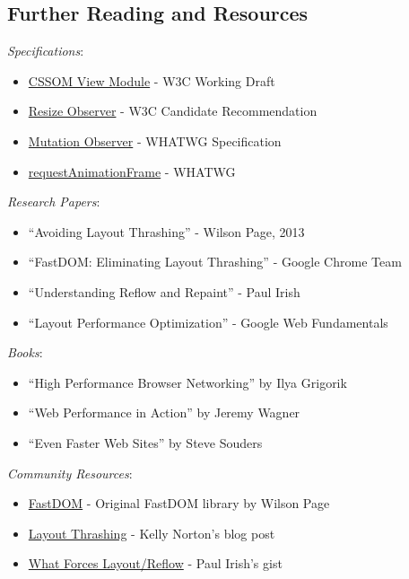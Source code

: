 \documentclass[11pt]{article}
\begin{document}
\subsection{Further Reading and Resources}
\label{sec:orgcc6445e}

\emph{Specifications}:

\begin{itemize}
\item \href{https://www.w3.org/TR/cssom-view-1/}{CSSOM View Module} - W3C Working Draft
\item \href{https://www.w3.org/TR/resize-observer-1/}{Resize Observer} - W3C Candidate Recommendation
\item \href{https://dom.spec.whatwg.org/\#mutation-observers}{Mutation Observer} - WHATWG Specification
\item \href{https://html.spec.whatwg.org/multipage/imagebitmap-and-animations.html\#animation-frames}{requestAnimationFrame} - WHATWG
\end{itemize}

\emph{Research Papers}:

\begin{itemize}
\item ``Avoiding Layout Thrashing'' - Wilson Page, 2013
\item ``FastDOM: Eliminating Layout Thrashing'' - Google Chrome Team
\item ``Understanding Reflow and Repaint'' - Paul Irish
\item ``Layout Performance Optimization'' - Google Web Fundamentals
\end{itemize}

\emph{Books}:

\begin{itemize}
\item ``High Performance Browser Networking'' by Ilya Grigorik
\item ``Web Performance in Action'' by Jeremy Wagner
\item ``Even Faster Web Sites'' by Steve Souders
\end{itemize}

\emph{Community Resources}:

\begin{itemize}
\item \href{https://github.com/wilsonpage/fastdom}{FastDOM} - Original FastDOM library by Wilson Page
\item \href{https://kellegous.com/j/2013/01/26/layout-performance/}{Layout Thrashing} - Kelly Norton's blog post
\item \href{https://gist.github.com/paulirish/5d52fb081b3570c81e3a}{What Forces Layout/Reflow} - Paul Irish's gist
\end{itemize}
\end{document}
